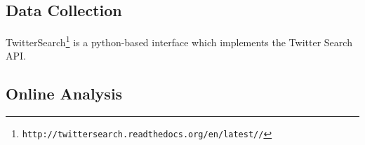 \documentclass{article}
\begin{document}
\subsection{Data Collection}
TwitterSearch\footnote{\texttt{\scriptsize{http://twittersearch.readthedocs.org/en/latest//‎‎}}} is a python-based interface which implements the Twitter Search API. 
\subsection{Online Analysis}
\end{document}
